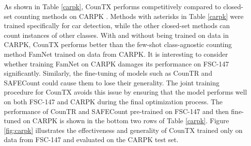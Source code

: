 \documentclass{bmvc2k}
\begin{document}
As shown in Table \ref{carpk}, CounTX performs competitively compared to closed-set counting methods on CARPK \cite{retina-net}. Methods with asterisks in Table \ref{carpk} were trained specifically for car detection, while the other closed-set methods can count instances of other classes. With and without being trained on data in CARPK, CounTX performs better than the few-shot class-agnostic counting method FamNet \cite{m_Ranjan-etal-CVPR21} trained on data from CARPK. It is interesting to consider whether training FamNet on CARPK damages its performance on FSC-147 \cite{m_Ranjan-etal-CVPR21} significantly. Similarly, the fine-tuning of models such as CounTR \cite{Liu2022CounTRTG} and SAFECount \cite{You_2023_WACV} could cause them to lose their generality. The joint training procedure for CounTX avoids this issue by ensuring that the model performs well on both FSC-147 and CARPK during the final optimization process. The performance of CounTR and SAFECount pre-trained on FSC-147 and then fine-tuned on CARPK is shown in the bottom two rows of Table \ref{carpk}. Figure \ref{fig:carpk} illustrates the effectiveness and generality of CounTX trained only on data from FSC-147 and evaluated on the CARPK test set.
\end{document}
